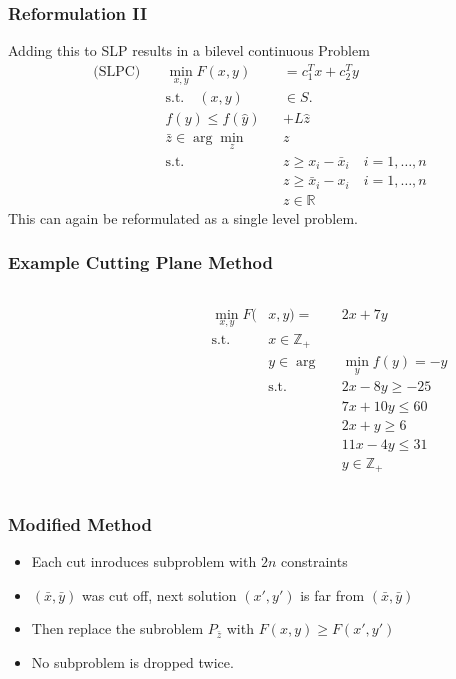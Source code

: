 \documentclass[11pt]{beamer}
\begin{document}
\begin{frame}
	\frametitle{Reformulation II}
	Adding this to SLP results in a bilevel continuous Problem 
\begin{alignat*}{2}
\text{(SLPC)} \quad &\min_{x,y} F(x,y)&& = c_1^Tx +c_2^Ty \\
&\text{s.t.} \quad (x,y)&& \in S. \\
&f(y) \le f(\hat y)&& + L \hat z \\
&\bar z \in \arg \min_{z}&& z \\
&  \text{s.t.} \quad &&z \ge x_i - \bar x_i \quad i = 1,\dots,n \\
& &&z \ge \bar x_i - x_i \quad i = 1,\dots,n \\
& && z \in \mathbb{R}
\end{alignat*}
This can again be reformulated as a single level problem.
\end{frame}

\begin{frame}
	\frametitle{Example Cutting Plane Method}
	\begin{columns}[T] %
		\begin{column}{.48\textwidth}
			
		\end{column}%
		\hfill%
		\begin{column}{.48\textwidth}
			\begin{alignat*}{2}
				\min_{x,y} F(&x,y) =&& 2x + 7y \\
				\text{s.t.}\quad &x \in \mathbb{Z}_+&& \\
				&y \in \arg&& \min_y f(y) = -y \\
				&\text{s.t.}\quad &&2x - 8y \ge -25 \\
				& &&7x + 10y \le 60 \\
				& &&2x + y \ge 6 \\
				& &&11x - 4y \le 31 \\
				& &&y \in \mathbb{Z}_+ 
			\end{alignat*}
		\end{column}%
	\end{columns}
\end{frame}

\begin{frame}
	\frametitle{Modified Method}
	\begin{itemize}
		\item Each cut inroduces subproblem with $2n$ constraints
		\item $(\bar x, \bar y)$ was cut off, next solution $(x',y')$ is far from  $(\bar x, \bar y)$
		\item Then replace the subroblem $P_{\bar z}$ with $F(x,y) \ge F(x',y')$
		\item No subproblem is dropped twice.
	\end{itemize}
\end{frame}
\end{document}
